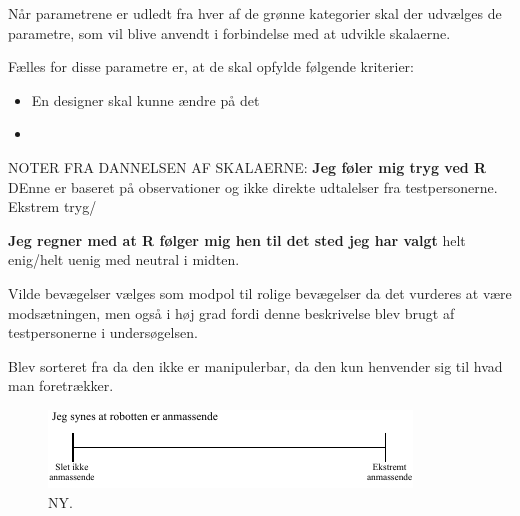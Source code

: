 





Når parametrene er udledt fra hver af de grønne kategorier skal der udvælges de parametre, som vil blive anvendt i forbindelse med at udvikle skalaerne. 

Fælles for disse parametre er, at de skal opfylde følgende kriterier: \blankline
%
\begin{itemize}
  \item En designer skal kunne ændre på det
  \item 
\end{itemize}



NOTER FRA DANNELSEN AF SKALAERNE:
\textbf{Jeg føler mig tryg ved R}
DEnne er baseret på observationer og ikke direkte udtalelser fra testpersonerne. 
Ekstrem tryg/

\textbf{Jeg regner med at R følger mig hen til det sted jeg har valgt} 
helt enig/helt uenig med neutral i midten. 

Vilde bevægelser vælges som modpol til rolige bevægelser da det vurderes at være modsætningen, men også i høj grad fordi denne beskrivelse blev brugt af testpersonerne i undersøgelsen. 

Blev sorteret fra da den ikke er manipulerbar, da den kun henvender sig til hvad man foretrækker. \blankline


%
\begin{figure}[H]
\centering
\includegraphics[width =\textwidth]{Figure/UdvalgteSkalaer/Anmassende} 
\caption{NY.}
\label{fig:SkalaAnmassende}
\end{figure}
\noindent
%

